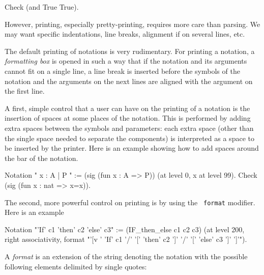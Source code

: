 \begin{coq_example}
Check (and True True).
\end{coq_example}

However, printing, especially pretty-printing, requires
more care than parsing. We may want specific indentations,
line breaks, alignment if on several lines, etc. 

The default printing of notations is very rudimentary. For printing a
notation, a {\em formatting box} is opened in such a way that if the
notation and its arguments cannot fit on a single line, a line break
is inserted before the symbols of the notation and the arguments on
the next lines are aligned with the argument on the first line.

A first, simple control that a user can have on the printing of a
notation is the insertion of spaces at some places of the
notation. This is performed by adding extra spaces between the symbols
and parameters: each extra space (other than the single space needed
to separate the components) is interpreted as a space to be inserted
by the printer. Here is an example showing how to add spaces around
the bar of the notation.

\begin{coq_example}
Notation "{{ x : A  |  P }}" := (sig (fun x : A => P))
  (at level 0, x at level 99).
Check (sig (fun x : nat => x=x)).
\end{coq_example}

The second, more powerful control on printing is by using the {\tt
format} modifier. Here is an example

\begin{small}
\begin{coq_example}
Notation "'If' c1 'then' c2 'else' c3" := (IF_then_else c1 c2 c3)
(at level 200, right associativity, format
"'[v   ' 'If'  c1 '/' '[' 'then'  c2  ']' '/' '[' 'else'  c3 ']' ']'").
\end{coq_example}
\end{small}

A {\em format} is an extension of the string denoting the notation with
the possible following elements delimited by single quotes:

